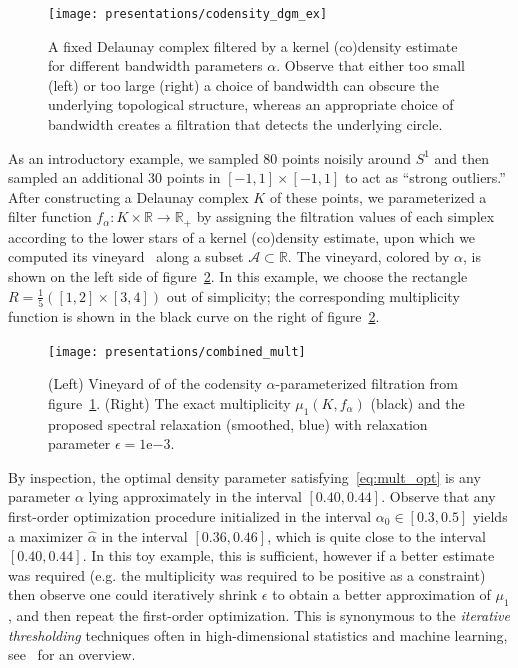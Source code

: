 \documentclass[10pt]{article}
\numberwithin{equation}{section}
\newcommand{\+}{%
	\raisebox{0.18ex}{\scaleobj{0.55}{+}}
}
\theoremstyle{definition}
\theoremstyle{definition}
\begin{document}
\begin{figure}[ht]
	\centering
	\texttt{[image: presentations/codensity\_dgm\_ex]}
	\caption{A fixed Delaunay complex filtered by a kernel (co)density estimate for different bandwidth parameters $\alpha$. Observe that either too small (left) or too large (right) a choice of bandwidth can obscure the underlying topological structure, whereas an appropriate choice of bandwidth creates a filtration that detects the underlying circle. 
	}\label{fig:codensity}
\end{figure}

As an introductory example, we sampled $80$ points noisily around $S^1$ and then sampled an additional $30$ points in $[-1,1] \times [-1,1]$ to act as ``strong outliers.'' After constructing a Delaunay complex $K$ of these points, we parameterized a filter function $f_\alpha : K \times \mathbb{R} \to \mathbb{R}_+$ by assigning the filtration values of each simplex according to the lower stars of a kernel (co)density estimate, upon which we computed its vineyard~\cite{cohen2006vines} along a subset $\mathcal{A} \subset \mathbb{R}$. The vineyard, colored by $\alpha$, is shown on the left side of figure~\ref{fig:vineyard_codensity}. In this example, we choose the rectangle $R = \frac{1}{5}([1, 2] \times [3,4])$ out of simplicity; the corresponding multiplicity function is shown in the black curve on the right of figure~\ref{fig:vineyard_codensity}. 
\begin{figure}[h]
	\centering
	\texttt{[image: presentations/combined\_mult]}
	\caption{(Left) Vineyard of of the codensity $\alpha$-parameterized filtration from figure~\ref{fig:codensity}. (Right) The exact multiplicity $\mu_1(K, f_\alpha)$ (black) and the proposed spectral relaxation (smoothed, blue) with relaxation parameter $\epsilon = 1\mathrm{e}{-3}$.}\label{fig:vineyard_codensity}
\end{figure}
By inspection, the optimal density parameter satisfying~\eqref{eq:mult_opt} is any parameter $\alpha$ lying approximately in the interval $[0.40, 0.44]$. 
Observe that any first-order optimization procedure initialized in the interval $\alpha_0 \in [0.3, 0.5]$ yields a maximizer $\hat{\alpha}$ in the interval $[0.36, 0.46]$, which is quite close to the interval $[0.40, 0.44]$. In this toy example, this is sufficient, however if a better estimate was required (e.g. the multiplicity was required to be positive as a constraint) then observe one could iteratively shrink $\epsilon$ to obtain a better approximation of $\mu_1$, and then repeat the first-order optimization. 
This is synonymous to the \emph{iterative thresholding} techniques often in high-dimensional statistics and machine learning, see~\cite{} for an overview.
\end{document}
